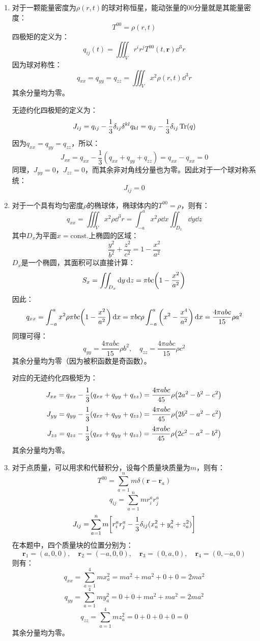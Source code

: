 \documentclass[a4paper]{article}
\begin{document}
\begin{enumerate}
    \item[8.(a)]
    对于一颗能量密度为$\rho(r, t)$的球对称恒星，能动张量的00分量就是其能量密度：
    \[
        T^{00} = \rho(r, t)
    \]
    四极矩的定义为：
    \[
        q_{ij}(t) = \iiint_V r^i r^j T^{00}(t, \mathbf{r}) \dd^3{r}
    \]
    因为球对称性：
    \[
        q_{xx} = q_{yy} = q_{zz} = \iiint_V x^2 \rho(r, t) \dd^3{r}
    \]
    其余分量均为零。

    无迹约化四极矩的定义为：
    \[
        J_{ij} = q_{ij} - \frac{1}{3} \delta_{ij} \delta^{kl} q_{kl} = q_{ij} - \frac{1}{3} \delta_{ij} \Tr(q)
    \]
    因为$q_{xx} = q_{yy} = q_{zz}$，所以：
    \[
        J_{xx} = q_{xx} - \frac{1}{3} (q_{xx} + q_{yy} + q_{zz}) = q_{xx} - q_{xx} = 0
    \]
    同理，$J_{yy} = 0$，$J_{zz} = 0$，而其余非对角线分量也为零。因此对于一个球对称系统：
    \[
        J_{ij} = 0
    \]

    \item[8.(b)]
    对于一个具有均匀密度$\rho$的椭球体，椭球体内的$T^{00} = \rho$，则有：
    \[
        q_{xx} = \iiint_V x^2 \rho \dd^3{r} = \int_{-a}^a x^2\rho \dd{x} \iint_{D_x} \dd{y} \dd{z}
    \]
    其中$D_x$为平面$x = \mathrm{const.}$上椭圆的区域：
    \[
        \frac{y^2}{b^2} + \frac{z^2}{c^2} = 1 - \frac{x^2}{a^2}
    \]
    $D_x$是一个椭圆，其面积可以直接计算：
    \[
        S_x = \iint_{D_x} \dd{y} \dd{z} = \pi b c \qty(1 - \frac{x^2}{a^2})
    \]
    因此：
    \[
        q_{xx} = \int_{-a}^a x^2 \rho \pi b c \qty(1 - \frac{x^2}{a^2}) \dd{x} = \pi b c \rho \int_{-a}^a \qty(x^2 - \frac{x^4}{a^2}) \dd{x} = \frac{4\pi abc}{15} \rho a^2
    \]
    同理可得：
    \[
        q_{yy} = \frac{4\pi abc}{15} \rho b^2,\quad q_{zz} = \frac{4\pi abc}{15} \rho c^2
    \]
    其余分量均为零（因为被积函数是奇函数）。

    对应的无迹约化四极矩为：
    \[
        J_{xx} = q_{xx} - \frac{1}{3} (q_{xx} + q_{yy} + q_{zz}) = \frac{4\pi abc}{45} \rho \qty(2a^2 - b^2 - c^2)
    \]
    \[
        J_{yy} = q_{yy} - \frac{1}{3} (q_{xx} + q_{yy} + q_{zz}) = \frac{4\pi abc}{45} \rho \qty(2b^2 - a^2 - c^2)
    \]
    \[
        J_{zz} = q_{zz} - \frac{1}{3} (q_{xx} + q_{yy} + q_{zz}) = \frac{4\pi abc}{45} \rho \qty(2c^2 - a^2 - b^2)
    \]
    其余分量均为零。

    \item[8.(c)]
    对于点质量，可以用求和代替积分，设每个质量块质量为$m$，则有：
    \[
        T^{00} = \sum_{a=1}^{n} m \delta(\mathbf{r} - \mathbf{r}_a)
    \]
    \[
        q_{ij} = \sum_{a=1}^{n} m r_i^a r_j^a
    \]
    \[
        J_{ij} = \sum_{a=1}^n m \qty[r_i^a r_j^a - \frac{1}{3} \delta_{ij} (x_a^2 + y_a^2 + z_a^2)]
    \]
    在本题中，四个质量块的位置分别为：
    \[
        \mathbf{r}_1 = (a, 0, 0),\quad \mathbf{r}_2 = (-a, 0, 0),\quad \mathbf{r}_3 = (0, a, 0),\quad \mathbf{r}_4 = (0, -a, 0)
    \]
    则有：
    \[
        q_{xx} = \sum_{a=1}^{4} m x_a^2 = ma^2 + ma^2 + 0 + 0 = 2ma^2
    \]
    \[
        q_{yy} = \sum_{a=1}^{4} m y_a^2 = 0 + 0 + ma^2 + ma^2 = 2ma^2
    \]
    \[
        q_{zz} = \sum_{a=1}^{4} m z_a^2 = 0 + 0 + 0 + 0 = 0
    \]
    其余分量均为零。


\end{enumerate}
\end{document}
